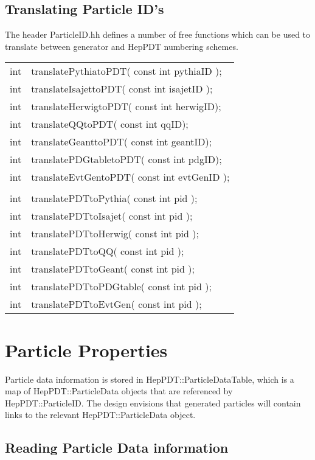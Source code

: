 \subsection { Translating Particle ID's }

The header ParticleID.hh defines a number of free functions which can
be used to translate between generator and HepPDT numbering schemes.

\begin{center}
\begin{tabular}{ll}
int & translatePythiatoPDT( const int pythiaID ); \\
int & translateIsajettoPDT( const int isajetID ); \\
int & translateHerwigtoPDT( const int herwigID); \\
int & translateQQtoPDT( const int qqID); \\
int & translateGeanttoPDT( const int geantID); \\
int & translatePDGtabletoPDT( const int pdgID); \\
int & translateEvtGentoPDT( const int evtGenID ); \\
 \\
int & translatePDTtoPythia( const int pid ); \\
int & translatePDTtoIsajet( const int pid ); \\
int & translatePDTtoHerwig( const int pid ); \\
int & translatePDTtoQQ( const int pid ); \\
int & translatePDTtoGeant( const int pid ); \\
int & translatePDTtoPDGtable( const int pid ); \\
int & translatePDTtoEvtGen( const int pid ); \\
\end{tabular}
\end{center}


\section { Particle Properties }

Particle data information is stored in HepPDT::ParticleDataTable, 
which is a map of HepPDT::ParticleData objects
that are referenced by HepPDT::ParticleID. 
The design envisions that generated particles will contain links
to the relevant  HepPDT::ParticleData object.

\subsection { Reading Particle Data information }

